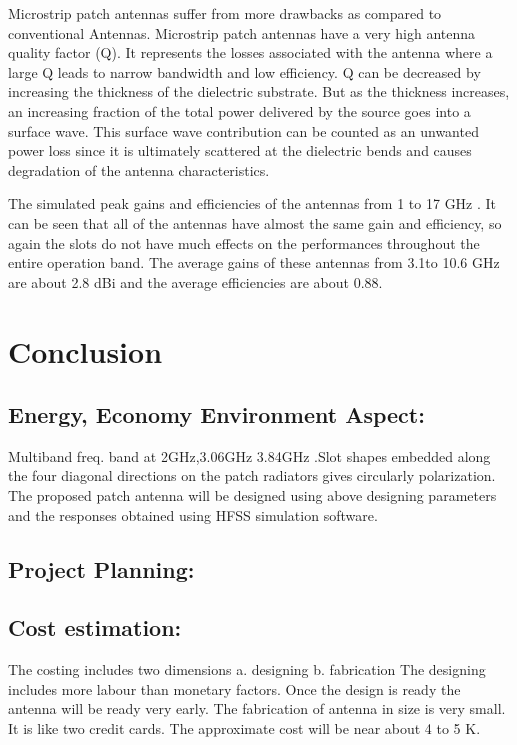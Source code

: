 \documentclass[12pt]{article}
\begin{document}
						                  Microstrip patch antennas suffer from more drawbacks as compared to conventional Antennas. Microstrip patch antennas have a very high antenna quality factor (Q). It represents the losses associated with the antenna where a large Q leads to narrow bandwidth and low efficiency. Q can be decreased by increasing the thickness of the dielectric substrate. But as the thickness increases, an increasing fraction of the total power delivered by the source goes into a surface wave. This surface wave contribution can be counted as an unwanted power loss since it is ultimately scattered at the dielectric bends and causes degradation of the antenna characteristics.
						                  
						                  The simulated peak gains and efficiencies of the antennas from 1 to 17 GHz . It can be seen that all of the antennas have almost the same gain and efficiency, so again the slots do not have much effects on the performances throughout the entire operation band. The average gains of these antennas from 3.1to 10.6 GHz are about 2.8 dBi and the average efficiencies are about 0.88.
						                  
						              
					               	
				

\cleardoublepage

\section{Conclusion}\label{sec:Conclusion}
    \subsection{Energy, Economy Environment Aspect:}\label{sub:Energy, Economy Environment Aspect:}
       Multiband freq. band at 2GHz,3.06GHz  3.84GHz  .Slot shapes embedded along the four diagonal directions on the patch radiators gives circularly polarization. The proposed patch antenna will be designed using above designing parameters and the responses obtained using HFSS simulation software.
    \subsection{Project Planning:}\label{sub:Project Planning:}

    \subsection{Cost estimation:}\label{sub:Cost estimation:}
      The costing includes two dimensions
      a.  designing
      b. fabrication
      The designing includes more labour than monetary factors. Once the design is ready the antenna will be ready very early.  The fabrication of antenna in size is very small.  It is like two credit cards.
      The approximate cost will be near about 4 to 5 K.
\cleardoublepage
\end{document}
